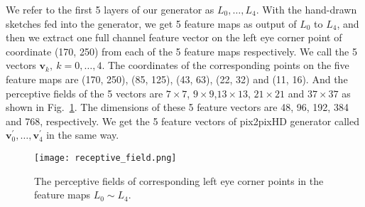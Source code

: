 \documentclass[10pt,twocolumn,letterpaper]{article}
\begin{document}
We refer to the first 5 layers of our generator as $L_0,\ldots,L_4$. With the hand-drawn sketches fed into the generator, we get 5 feature maps as output of $L_0$ to $L_4$, and then we extract one full channel feature vector on the left eye corner point of coordinate (170, 250) from each of the 5 feature maps respectively. We call the 5 vectors $\boldsymbol{v}_k,~k=0,\ldots,4$. The coordinates of the corresponding points on the five feature maps are (170, 250), (85, 125), (43, 63), (22, 32) and (11, 16). And the perceptive fields of the 5 vectors are $7\times7$, $9\times9$,$13\times13$, $21\times21$ and $37\times37$ as shown in Fig.~\ref{fig:receptive}. The dimensions of these 5 feature vectors are 48, 96, 192, 384 and 768, respectively. We get the 5 feature vectors of pix2pixHD generator called $\boldsymbol{v}_0^{'},\ldots,\boldsymbol{v}_4^{'}$ in the same way.
\begin{figure}[htbp]
	\begin{center}
	\texttt{[image: receptive\_field.png]}
	\end{center}
	\caption{The perceptive fields of corresponding left eye corner points in the feature maps $L_0\sim L_4$. }
	\label{fig:receptive}
\end{figure}
\end{document}
